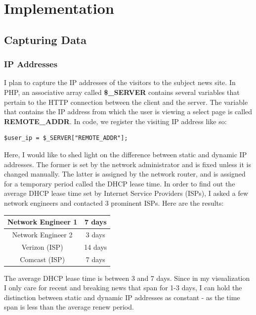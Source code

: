 \documentclass[12pt]{article}
\begin{document}
\vfill

\section{Implementation}
\subsection{Capturing Data}
\subsubsection{IP Addresses}
I plan to capture the IP addresses of the visitors to the subject news site. In PHP, an associative array called \textbf{\$\_SERVER}  contains several variables that pertain to the HTTP connection between the client and the server. The variable that contains the IP address from which the user is viewing a select page is called \textbf{REMOTE\_ADDR}. In code, we register the visiting IP address like so:
\begin{lstlisting}
$user_ip = $_SERVER["REMOTE_ADDR"];
\end{lstlisting}

Here, I would like to shed light on the difference between static and dynamic IP addresses. The former is set by the network administrator and is fixed unless it is changed manually. The latter is assigned by the network router, and is assigned for a temporary period called the DHCP lease time. In order to find out the average DHCP lease time set by Internet Service Providers (ISPs), I asked a few network engineers and contacted 3 prominent ISPs. Here are the results:
\vspace{0.3in}

\begin{tabular}{| c | c |}
  \hline                       
  Network Engineer 1 & 7 days \\[1ex] \hline
  Network Engineer 2 & 3 days \\[1ex] \hline
  Verizon (ISP) & 14 days \\[1ex] \hline
  Comcast (ISP) & 7 days \\[1ex]
  \hline  
\end{tabular}
\vspace{0.3in}

The average DHCP lease time is between 3 and 7 days. Since in my visualization I only care for recent and breaking news that span for 1-3 days, I can hold the distinction between static and dynamic IP addresses as constant - as the time span is less than the average renew period.   
\end{document}
